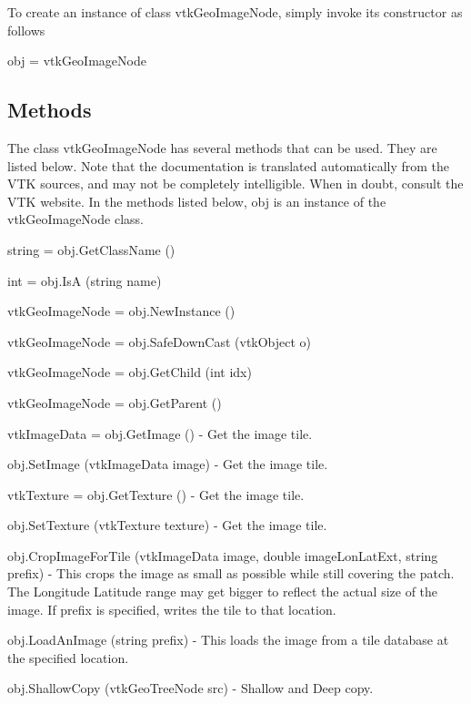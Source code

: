 To create an instance of class vtk\-Geo\-Image\-Node, simply invoke its constructor as follows \begin{DoxyVerb}  obj = vtkGeoImageNode
\end{DoxyVerb}
 \hypertarget{vtkwidgets_vtkxyplotwidget_Methods}{}\subsection{Methods}\label{vtkwidgets_vtkxyplotwidget_Methods}
The class vtk\-Geo\-Image\-Node has several methods that can be used. They are listed below. Note that the documentation is translated automatically from the V\-T\-K sources, and may not be completely intelligible. When in doubt, consult the V\-T\-K website. In the methods listed below, {\ttfamily obj} is an instance of the vtk\-Geo\-Image\-Node class. 
\begin{DoxyItemize}
\item {\ttfamily string = obj.\-Get\-Class\-Name ()}  
\item {\ttfamily int = obj.\-Is\-A (string name)}  
\item {\ttfamily vtk\-Geo\-Image\-Node = obj.\-New\-Instance ()}  
\item {\ttfamily vtk\-Geo\-Image\-Node = obj.\-Safe\-Down\-Cast (vtk\-Object o)}  
\item {\ttfamily vtk\-Geo\-Image\-Node = obj.\-Get\-Child (int idx)}  
\item {\ttfamily vtk\-Geo\-Image\-Node = obj.\-Get\-Parent ()}  
\item {\ttfamily vtk\-Image\-Data = obj.\-Get\-Image ()} -\/ Get the image tile.  
\item {\ttfamily obj.\-Set\-Image (vtk\-Image\-Data image)} -\/ Get the image tile.  
\item {\ttfamily vtk\-Texture = obj.\-Get\-Texture ()} -\/ Get the image tile.  
\item {\ttfamily obj.\-Set\-Texture (vtk\-Texture texture)} -\/ Get the image tile.  
\item {\ttfamily obj.\-Crop\-Image\-For\-Tile (vtk\-Image\-Data image, double image\-Lon\-Lat\-Ext, string prefix)} -\/ This crops the image as small as possible while still covering the patch. The Longitude Latitude range may get bigger to reflect the actual size of the image. If prefix is specified, writes the tile to that location.  
\item {\ttfamily obj.\-Load\-An\-Image (string prefix)} -\/ This loads the image from a tile database at the specified location.  
\item {\ttfamily obj.\-Shallow\-Copy (vtk\-Geo\-Tree\-Node src)} -\/ Shallow and Deep copy.  

\end{DoxyItemize}

